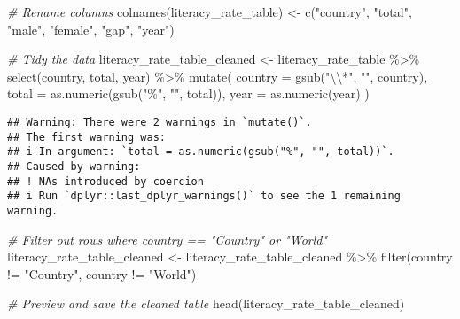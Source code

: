 \documentclass[
]{article}
\newenvironment{Shaded}{\begin{snugshade}}{\end{snugshade}}
\newcommand{\AttributeTok}[1]{\textcolor[rgb]{0.77,0.63,0.00}{#1}}
\newcommand{\CommentTok}[1]{\textcolor[rgb]{0.56,0.35,0.01}{\textit{#1}}}
\newcommand{\FunctionTok}[1]{\textcolor[rgb]{0.00,0.00,0.00}{#1}}
\newcommand{\NormalTok}[1]{#1}
\newcommand{\OtherTok}[1]{\textcolor[rgb]{0.56,0.35,0.01}{#1}}
\newcommand{\SpecialCharTok}[1]{\textcolor[rgb]{0.00,0.00,0.00}{#1}}
\newcommand{\StringTok}[1]{\textcolor[rgb]{0.31,0.60,0.02}{#1}}
\begin{document}
\begin{Shaded}
\begin{Highlighting}[]
\CommentTok{\# Rename columns}
\FunctionTok{colnames}\NormalTok{(literacy\_rate\_table) }\OtherTok{\textless{}{-}} \FunctionTok{c}\NormalTok{(}\StringTok{"country"}\NormalTok{, }\StringTok{"total"}\NormalTok{, }\StringTok{"male"}\NormalTok{, }\StringTok{"female"}\NormalTok{, }\StringTok{"gap"}\NormalTok{, }\StringTok{"year"}\NormalTok{)}

\CommentTok{\# Tidy the data}
\NormalTok{literacy\_rate\_table\_cleaned }\OtherTok{\textless{}{-}}\NormalTok{ literacy\_rate\_table }\SpecialCharTok{\%\textgreater{}\%}
  \FunctionTok{select}\NormalTok{(country, total, year) }\SpecialCharTok{\%\textgreater{}\%}
  \FunctionTok{mutate}\NormalTok{(}
    \AttributeTok{country =} \FunctionTok{gsub}\NormalTok{(}\StringTok{"}\SpecialCharTok{\textbackslash{}\textbackslash{}}\StringTok{*"}\NormalTok{, }\StringTok{""}\NormalTok{, country),  }
    \AttributeTok{total =} \FunctionTok{as.numeric}\NormalTok{(}\FunctionTok{gsub}\NormalTok{(}\StringTok{"\%"}\NormalTok{, }\StringTok{""}\NormalTok{, total)), }
    \AttributeTok{year =} \FunctionTok{as.numeric}\NormalTok{(year)                 }
\NormalTok{  )}
\end{Highlighting}
\end{Shaded}

\begin{verbatim}
## Warning: There were 2 warnings in `mutate()`.
## The first warning was:
## i In argument: `total = as.numeric(gsub("%", "", total))`.
## Caused by warning:
## ! NAs introduced by coercion
## i Run `dplyr::last_dplyr_warnings()` to see the 1 remaining warning.
\end{verbatim}

\begin{Shaded}
\begin{Highlighting}[]
\CommentTok{\# Filter out rows where country == "Country" or "World"}
\NormalTok{literacy\_rate\_table\_cleaned }\OtherTok{\textless{}{-}}\NormalTok{ literacy\_rate\_table\_cleaned }\SpecialCharTok{\%\textgreater{}\%}
  \FunctionTok{filter}\NormalTok{(country }\SpecialCharTok{!=} \StringTok{"Country"}\NormalTok{,              }
\NormalTok{         country }\SpecialCharTok{!=} \StringTok{"World"}\NormalTok{)    }

\CommentTok{\# Preview and save the cleaned table}
\FunctionTok{head}\NormalTok{(literacy\_rate\_table\_cleaned)}
\end{Highlighting}
\end{Shaded}
\end{document}
